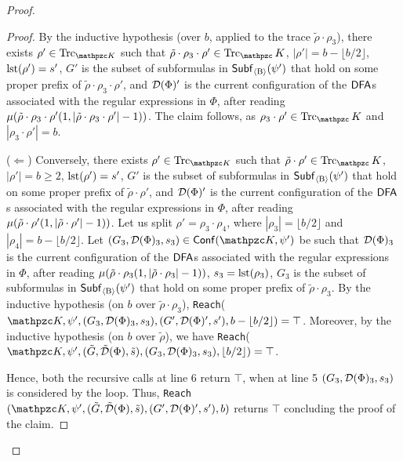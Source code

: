 \begin{proof}
\begin{proof}
    By the inductive hypothesis (over $b$, applied to the trace $\tilde{\rho}\cdot\rho_3$), there exists $\rho'\in\Trk_{\Ku}$ such that $\tilde{\rho}\cdot\rho_3\cdot \rho'\in\Trk_\Ku$, $|\rho'|=b-\lfloor b/2\rfloor$, $\operatorname{lst}(\rho')=s'$, $G'$ is the subset of subformulas in $\mathsf{Subf}_{\operatorname{\langle B\rangle}}(\psi')$ that hold on some proper prefix of $\tilde{\rho}\cdot\rho_3\cdot \rho'$, and $\mathcal{D}(\Phi)'$ is the current configuration of the $\text{\sffamily DFA}$s associated with the regular expressions in $\Phi$, after reading $\mu(\tilde{\rho}\cdot\rho_3\cdot \rho'(1,|\tilde{\rho}\cdot\rho_3\cdot \rho'|-1))$.
    The claim follows, as $\rho_3\cdot\rho'\in\Trk_\Ku$ and $|\rho_3\cdot\rho'|=b$.
    
    ($\Leftarrow$)
    Conversely, there exists $\rho'\in\Trk_{\Ku}$ such that $\tilde{\rho}\cdot\rho'\in\Trk_\Ku$, $|\rho'|=b\geq 2$, $\operatorname{lst}(\rho')=s'$, $G'$ is the subset of subformulas in $\mathsf{Subf}_{\operatorname{\langle B\rangle}}(\psi')$ that hold on some proper prefix of $\tilde{\rho}\cdot\rho'$, and $\mathcal{D}(\Phi)'$ is the current configuration of the $\text{\sffamily DFA}$s associated with the regular expressions in $\Phi$, after reading $\mu(\tilde{\rho}\cdot\rho'(1,|\tilde{\rho}\cdot\rho'|-1))$.
    Let us split $\rho'=\rho_3\cdot\rho_4$, where $|\rho_3|=\lfloor b/2\rfloor$ and $|\rho_4|=b-\lfloor b/2\rfloor$.
    Let $(G_3,\Du(\Phi)_3,s_3)\in\conf(\Ku,\psi')$ be such that $\mathcal{D}(\Phi)_3$ is the current configuration of the $\text{\sffamily DFA}$s associated with the regular expressions in $\Phi$, after reading $\mu(\tilde{\rho}\cdot\rho_3(1,|\tilde{\rho}\cdot\rho_3|-1))$, $s_3=\operatorname{lst}(\rho_3)$, $G_3$ is the subset of subformulas in $\mathsf{Subf}_{\operatorname{\langle B\rangle}}(\psi')$ that hold on some proper prefix of $\tilde{\rho}\cdot\rho_3$. By the inductive hypothesis (on $b$ over $\tilde{\rho}\cdot\rho_3$), 
    \texttt{Reach}($\Ku,\psi',(G_3,\Du(\Phi)_3,s_3),(G',\Du(\Phi)',s'),b-\lfloor b/2\rfloor)=\top$.
    Moreover, by the inductive hypothesis (on $b$ over $\tilde{\rho}$), we have
    \texttt{Reach}($\Ku,\psi',(\tilde{G},\tilde{\Du}(\Phi),\tilde{s}),(G_3,\Du(\Phi)_3,s_3),\allowbreak \lfloor b/2\rfloor)=\top$.
    
    Hence, both the recursive calls at line 6 return $\top$, when at line 5 $(G_3,\mathcal{D}(\Phi)_3,s_3)$ is considered by the loop. Thus, \texttt{Reach}$(\Ku,\psi',(\tilde{G},\tilde{\Du}(\Phi),\tilde{s}),(G',\Du(\Phi)',s'),b)$ returns $\top$ concluding the proof of the claim.
    \end{proof}
    

\end{proof}
